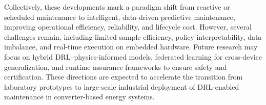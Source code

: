 Collectively, these developments mark a paradigm shift from reactive or scheduled maintenance to intelligent, data-driven predictive maintenance, improving operational efficiency, reliability, and lifecycle cost. 
However, several challenges remain, including limited sample efficiency, policy interpretability, data imbalance, and real-time execution on embedded hardware. 
Future research may focus on hybrid DRL–physics-informed models, federated learning for cross-device generalization, and runtime assurance frameworks to ensure safety and certification. 
These directions are expected to accelerate the transition from laboratory prototypes to large-scale industrial deployment of DRL-enabled maintenance in converter-based energy systems.

